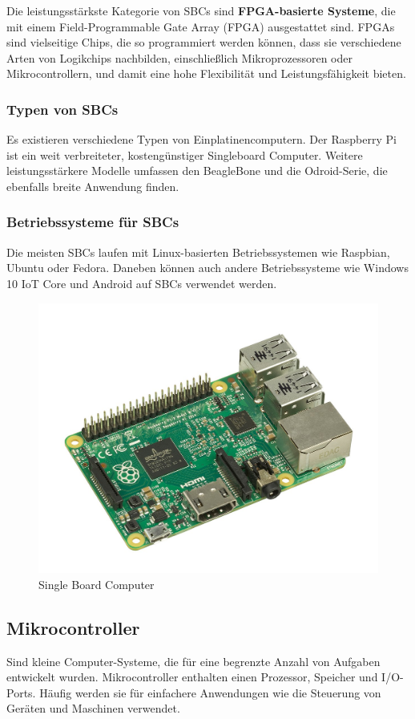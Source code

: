 Die leistungsstärkste Kategorie von SBCs sind \textbf{FPGA-basierte Systeme}, die mit einem Field-Programmable Gate Array (FPGA) ausgestattet sind. FPGAs sind vielseitige Chips, die so programmiert werden können, dass sie verschiedene Arten von Logikchips nachbilden, einschließlich Mikroprozessoren oder Mikrocontrollern, und damit eine hohe Flexibilität und Leistungsfähigkeit bieten.

\subsubsection{Typen von SBCs}
Es existieren verschiedene Typen von Einplatinencomputern. Der Raspberry Pi ist ein weit verbreiteter, kostengünstiger Singleboard Computer. Weitere leistungsstärkere Modelle umfassen den BeagleBone und die Odroid-Serie, die ebenfalls breite Anwendung finden.

\subsubsection{Betriebssysteme für SBCs}
Die meisten SBCs laufen mit Linux-basierten Betriebssystemen wie Raspbian, Ubuntu oder Fedora. Daneben können auch andere Betriebssysteme wie Windows 10 IoT Core und Android auf SBCs verwendet werden. \parencite{EinplatinencomputerSBCs}

\begin{figure}[H]
	\centering
	\includegraphics[width=0.7\linewidth]{images/SingleBoard Computer.jpg}
	\caption[Single Board Computer]{Single Board Computer}
	\label{fig:Single Board Computer}
\end{figure}

\subsection{Mikrocontroller}
Sind kleine Computer-Systeme, die für eine begrenzte Anzahl von Aufgaben entwickelt wurden. Mikrocontroller enthalten einen Prozessor, Speicher und I/O-Ports. Häufig werden sie für einfachere Anwendungen wie die Steuerung von Geräten und Maschinen verwendet. \parencite{EinzelplatinencomputerVsMikrocontroller}

